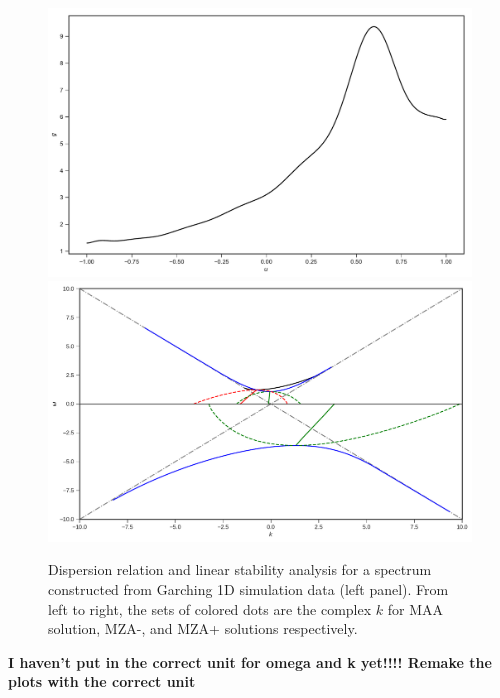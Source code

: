 \documentclass[%
preprint,
 amsmath,amssymb,
 aps,
 prd
]{revtex4-1}
\begin{document}
\begin{figure}
     \includegraphics[width=\linewidth]{assets/spectGarchingPlt.pdf}
   \endminipage\hfill
   \includegraphics[width=\linewidth]{assets/spectGarchingDRLSAPltBlob.pdf}
   \endminipage\hfill
   \caption{Dispersion relation and linear stability analysis for a spectrum constructed from Garching 1D simulation data (left panel). From left to right, the sets of colored dots are the complex $k$ for MAA solution, MZA-, and MZA+ solutions respectively.
    }
   \label{fig-garching}
\end{figure}

{\color{red} \bf I haven't put in the correct unit for omega and k yet!!!! Remake the plots with the correct unit}


\end{document}
